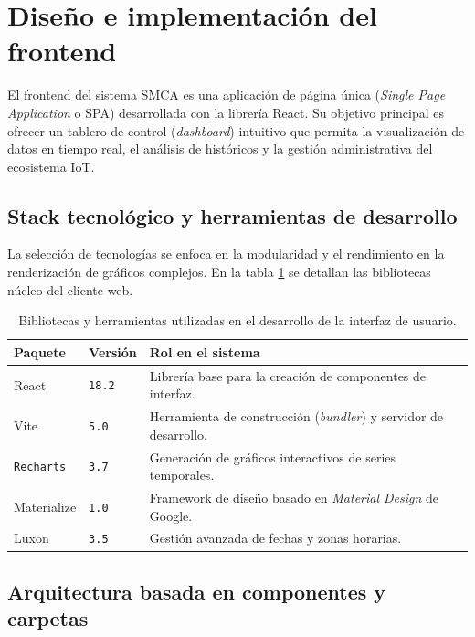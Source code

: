 \section{Diseño e implementación del frontend}

El frontend del sistema SMCA es una aplicación de página única (\textit{Single Page Application} o SPA) desarrollada con la librería React. Su objetivo principal es ofrecer un tablero de control (\textit{dashboard}) intuitivo que permita la visualización de datos en tiempo real, el análisis de históricos y la gestión administrativa del ecosistema IoT.

\subsection{Stack tecnológico y herramientas de desarrollo}

La selección de tecnologías se enfoca en la modularidad y el rendimiento en la renderización de gráficos complejos. En la tabla \ref{tab:stack-frontend} se detallan las bibliotecas núcleo del cliente web.

\begin{table}[h]
    \centering
    \caption[Stack tecnológico del frontend]{Bibliotecas y herramientas utilizadas en el desarrollo de la interfaz de usuario.}
    \label{tab:stack-frontend}
    \begin{tabular}{p{3.5cm} p{2cm} p{6.5cm}}
        \toprule
        \textbf{Paquete} & \textbf{Versión} & \textbf{Rol en el sistema} \\
        \midrule
        React & \texttt{18.2} & Librería base para la creación de componentes de interfaz. \\
        Vite & \texttt{5.0} & Herramienta de construcción (\textit{bundler}) y servidor de desarrollo. \\
        \texttt{Recharts} & \texttt{3.7} & Generación de gráficos interactivos de series temporales. \\
        Materialize & \texttt{1.0} & Framework de diseño basado en \textit{Material Design} de Google. \\
        Luxon & \texttt{3.5} & Gestión avanzada de fechas y zonas horarias. \\
        \bottomrule
    \end{tabular}
\end{table}

\subsection{Arquitectura basada en componentes y carpetas}

